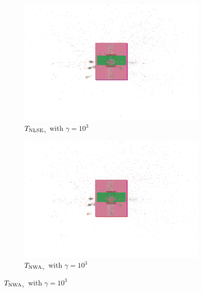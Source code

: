 \begin{figure}[p]
 \begin{subfigure}{.48\textwidth}
  \includegraphics[width=\textwidth, frame]{baseline/convergence_Chip1_LSE_1000_gamma.png}  
  \caption{\(T_{\operatorname{NLSE}_\gamma}\) with \(\gamma = 10^3\)}
 \end{subfigure}
 \hfill
 \begin{subfigure}{.48\textwidth}
  \includegraphics[width=\textwidth, frame]{baseline/convergence_Chip1_WA_1000_gamma.png}  
  \caption{\(T_{\operatorname{NWA}_\gamma}\) with \(\gamma = 10^3\)}
 \end{subfigure}
 
 \bigskip
 

\end{figure}
